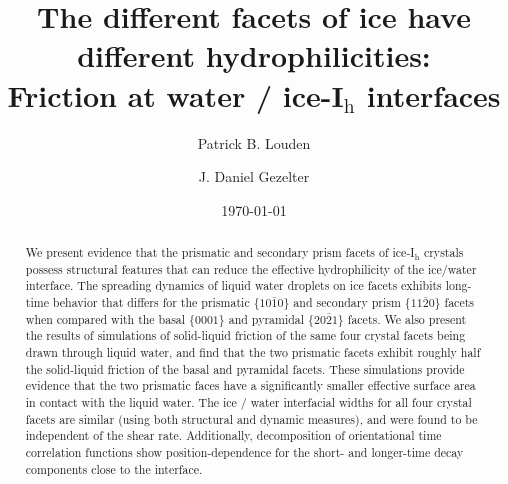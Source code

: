 \documentclass[aps,jcp,preprint,showpacs,superscriptaddress,groupedaddress]{revtex4}  %
\begin{document}
\title{The different facets of ice have different hydrophilicities: \\
  Friction at water / ice-I$_\mathrm{h}$ interfaces}
\author{Patrick B. Louden}
\author{J. Daniel Gezelter}

\date{\today}


\begin{abstract}
  We present evidence that the prismatic and secondary prism facets of
  ice-I$_\mathrm{h}$ crystals possess structural features that can
  reduce the effective hydrophilicity of the ice/water interface. The
  spreading dynamics of liquid water droplets on ice facets exhibits
  long-time behavior that differs for the prismatic
  $\{10\bar{1}0\}$ and secondary prism $\{11\bar{2}0\}$ facets
  when compared with the basal $\{0001\}$ and pyramidal
  $\{20\bar{2}1\}$ facets.  We also present the results of
  simulations of solid-liquid friction of the same four crystal facets
  being drawn through liquid water, and find that the two prismatic
  facets exhibit roughly half the solid-liquid friction of the basal
  and pyramidal facets.  These simulations provide evidence that the
  two prismatic faces have a significantly smaller effective surface
  area in contact with the liquid water. The ice / water interfacial
  widths for all four crystal facets are similar (using both
  structural and dynamic measures), and were found to be independent
  of the shear rate.  Additionally, decomposition of orientational
  time correlation functions show position-dependence for the short-
  and longer-time decay components close to the interface.
\end{abstract}

\maketitle
\end{document}
